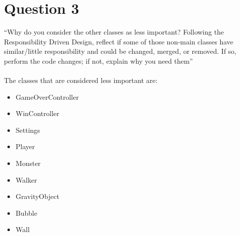 \section{Question 3}
``Why do you consider the other classes as less important? Following the Responsibility Driven Design,
reflect if some of those non-main classes have similar/little responsibility and could be changed,
merged, or removed. If so, perform the code changes; if not, explain why you need them''\\
\\
The classes that are considered less important are:
\begin{itemize}
	\item GameOverController
	\item WinController
	\item Settings
	\item Player
	\item Monster
	\item Walker
	\item GravityObject
	\item Bubble
	\item Wall
\end{itemize}

